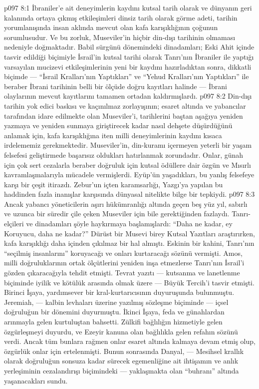 \vs p097 8:1 İbraniler’e ait deneyimlerin kaydını kutsal tarih olarak ve dünyanın geri kalanında ortaya çıkmış etkileşimleri dinsiz tarih olarak görme adeti, tarihin yorumlanışında insan aklında mevcut olan kafa karışıklığının çoğunun sorumlusudur. Ve bu zorluk, Museviler’in hiçbir din\hyp{}dışı tarihinin olmaması nedeniyle doğmaktadır. Babil sürgünü dönemindeki dinadamları; Eski Ahit içinde tasvir edildiği biçimiyle İsrail’in kutsal tarihi olarak Tanrı’nın İbraniler ile yaptığı varsayılan mucizevi etkileşimlerinin yeni bir kaydını hazırladıktan sonra, dikkatli biçimde --- “İsrail Kralları’nın Yaptıkları” ve “Yehud Kralları’nın Yaptıkları” ile beraber İbrani tarihinin belli bir ölçüde doğru kayıtları halinde --- İbrani olaylarının mevcut kayıtlarını tamamen ortadan kaldırmışlardı.
\vs p097 8:2 Din\hyp{}dışı tarihin yok edici baskısı ve kaçınılmaz zorlayışının; esaret altında ve yabancılar tarafından idare edilmekte olan Museviler’i, tarihlerini baştan aşağıya yeniden yazmaya ve yeniden sunmaya giriştirecek kadar nasıl dehşete düşürdüğünü anlamak için, kafa karışıklığına iten milli deneyimlerinin kaydını kısaca irdelememiz gerekmektedir. Museviler’in, din\hyp{}kuramı içermeyen yeterli bir yaşam felsefesi geliştirmede başarısız oldukları hatırlanmak zorundadır. Onlar, günah için çok sert cezalarla beraber doğruluk için kutsal ödüllere dair özgün ve Mısırlı kavramlaşmalarıyla mücadele vermişlerdi. Eyüp’ün yaşadıkları, bu yanlış felsefeye karşı bir çeşit itirazdı. Zebur’un içten karamsarlığı, Yazgı’ya yapılan bu haddinden fazla inanışlar karşısında dünyasal nitelikte bilge bir tepkiydi.
\vs p097 8:3 Ancak yabancı yöneticilerin aşırı hükümranlığı altında geçen beş yüz yıl, sabırlı ve uzunca bir süredir çile çeken Museviler için bile gerektiğinden fazlaydı. Tanrı\hyp{}elçileri ve dinadamları şöyle haykırmaya başlamışlardı: “Daha ne kadar, ey Koruyucu, daha ne kadar?” Dürüst bir Musevi birey Kutsal Yazıtları araştırırken, kafa karışıklığı daha içinden çıkılmaz bir hal almıştı. Eskinin bir kahini, Tanrı’nın “seçilmiş insanlarını” koruyacağı ve onları kurtaracağı sözünü vermişti. Amos, milli doğruluklarının ortak ölçütlerini yeniden inşa etmezlerse Tanrı’nın İsrail’i gözden çıkaracağıyla tehdit etmişti. Tevrat yazıtı --- kutsanma ve lanetlenme biçiminde iyilik ve kötülük arasında olmak üzere --- Büyük Tercih’i tasvir etmişti. Birinci İşaya, yardımsever bir kral\hyp{}kurtarıcısının duyuruşunda bulunmuştu. Jeremiah, --- kalbin levhaları üzerine yazılmış sözleşme biçiminde --- içsel doğruluğun bir dönemini duyurmuştu. İkinci İşaya, feda ve günahlardan arınmayla gelen kurtuluştan bahsetti. Zülkifi bağlılığın hizmetiyle gelen özgürleşmeyi duyurdu, ve Ezeyir kanuna olan bağlılıkla gelen refahın sözünü verdi. Ancak tüm bunlara rağmen onlar esaret altında kalmaya devam etmiş olup, özgürlük onlar için ertelenmişti. Bunun sonrasında Danyal, --- Mesihsel krallık olarak doğruluğun sonsuza kadar sürecek egemenliğine ait ihtişamın ve anlık yerleşiminin cezalandırışı biçimindeki --- yaklaşmakta olan “buhranı” altında yaşanacakları sundu.
